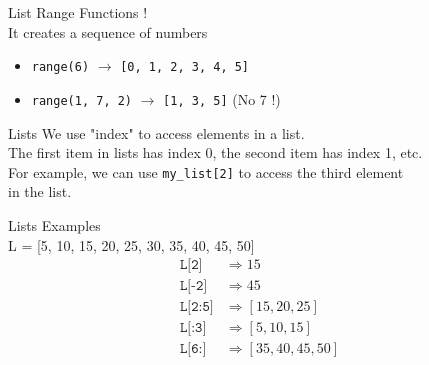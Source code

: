 \documentclass{beamer}
\begin{document}
    \begin{frame}{List}
        \color{blue} \Large Range Functions ! \\
        \color{black} \normalsize \vskip 10pt
        It creates a sequence of numbers
        \begin{itemize}
            \item \texttt{range(6)} $\rightarrow$ \texttt{[0, 1, 2, 3, 4, 5]}
            \item \texttt{range(1, 7, 2)} $\rightarrow$ \texttt{[1, 3, 5]} (No 7 !)
        \end{itemize}
    \end{frame}
    
    \begin{frame}{Lists}
        We use "index" to access elements in a list. \\
        The first item in lists has index 0, the second item has index 1, etc.\\
        For example, we can use \texttt{my\_list[2]} to access the third element\\
        in the list.
    \end{frame}
    
    \begin{frame}{Lists}
        \color{blue} \Large Examples \\
        \color{black} \normalsize
        L = [5, 10, 15, 20, 25, 30, 35, 40, 45, 50] \\
        \begin{align*}
            \texttt{L[2]} & \Rightarrow 15 \\
            \texttt{L[-2]} & \Rightarrow 45 \\
            \texttt{L[2:5]} & \Rightarrow [15, 20, 25] \\
            \texttt{L[:3]} & \Rightarrow [5, 10, 15] \\
            \texttt{L[6:]} & \Rightarrow [35, 40, 45, 50] \\
        \end{align*}
    \end{frame}
    
\end{document}
